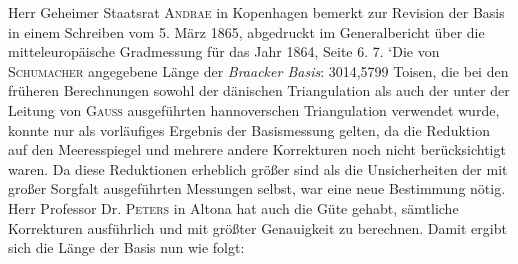 Herr Geheimer Staatsrat \textsc{Andrae} in Kopenhagen bemerkt zur Revision der Basis in einem Schreiben vom 5. März 1865, abgedruckt im Generalbericht über die mitteleuropäische Gradmessung für das Jahr 1864, Seite 6. 7. ‘Die von \textsc{Schumacher} angegebene Länge der \textit{Braacker Basis}: 3014,5799 Toisen, die bei den früheren Berechnungen sowohl der dänischen Triangulation als auch der unter der Leitung von \textsc{Gauss} ausgeführten hannoverschen Triangulation verwendet wurde, konnte nur als vorläufiges Ergebnis der Basismessung gelten, da die Reduktion auf den Meeresspiegel und mehrere andere Korrekturen noch nicht berücksichtigt waren. Da diese Reduktionen erheblich größer sind als die Unsicherheiten der mit großer Sorgfalt ausgeführten Messungen selbst, war eine neue Bestimmung nötig. Herr Professor Dr. \textsc{Peters} in Altona hat auch die Güte gehabt, sämtliche Korrekturen ausführlich und mit größter Genauigkeit zu berechnen. Damit ergibt sich die Länge der Basis nun wie folgt:
